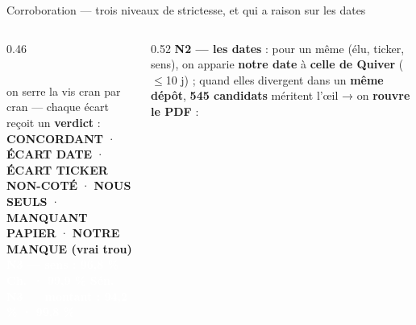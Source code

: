\documentclass[11pt,aspectratio=169]{beamer}
\newcommand{\badge}[2]{\colorbox{#1}{\textcolor{white}{\footnotesize\textbf{#2}}}}
\begin{document}
\begin{frame}{Corroboration --- trois niveaux de strictesse, et qui a raison sur les dates}
  \begin{columns}[T]
    \begin{column}{0.46\textwidth}
      \centering
      \vspace{2mm}
      \\[2mm]
      {\scriptsize on serre la vis cran par cran — chaque écart reçoit un \textbf{verdict} :\\[0.8mm]
       \textcolor{okgreen}{\textbf{CONCORDANT}} ·
       \textcolor{warnorange}{\textbf{ÉCART DATE}} ·
       \textcolor{warnorange}{\textbf{ÉCART TICKER}}\\
       \textcolor{black!60}{\textbf{NON-COTÉ}} ·
       \textcolor{helec}{\textbf{NOUS SEULS}} ·
       \textcolor{warnorange}{\textbf{MANQUANT PAPIER}} ·
       \textcolor{alertred}{\textbf{NOTRE MANQUE (vrai trou)}}}\\[2.5mm]
      \badge{okgreen}{N3 — sens : 96,8 \% Ch.\ · 99,9 \% Sén.}\\[1mm]
      \badge{okgreen}{N3 — montant : 94,2 \% · 99,8 \%}
    \end{column}
    \begin{column}{0.52\textwidth}
      {\footnotesize \textbf{N2 --- les dates} : pour un même (élu, ticker, sens), on apparie \textbf{notre date} à \textbf{celle de Quiver} ($\leq$10 j) ; quand elles divergent dans un \textbf{même dépôt}, \textbf{545 candidats} méritent l'œil → on \textbf{rouvre le PDF} :}\\[1mm]

\end{column}
\end{columns}
\end{frame}
\end{document}

